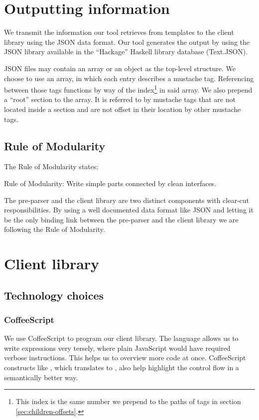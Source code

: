 \documentclass[thesis.tex]{subfiles}
\begin{document}
\section{Outputting information}
\label{sec:output}
We transmit the information our tool retrieves from templates to the client
library using the JSON data format. Our tool generates the output by using the
JSON library available in the ``Hackage'' Haskell library database (Text.JSON).

JSON files may contain an array or an object as the top-level structure.
We choose to use an array, in which each entry describes a mustache tag.
Referencing between those tags functions by way of the index\footnote{This index
	is the same number we prepend to the paths of tags in
	section \ref{sec:children-offsets}.} in said array.
We also prepend a ``root'' section to the array. It is referred to by mustache
tags that are not located inside a section and are not offset in their location
by other mustache tags.

\subsection{Rule of Modularity}
\label{sec:modularity}
The Rule of Modularity states:
\begin{citequote}{\cite[Chapter 1]{UXART}}
Rule of Modularity: Write simple parts connected by clean interfaces.
\end{citequote}
The pre-parser and the client library are two distinct components with clear-cut
responsibilities. By using a well documented data format like JSON and letting
it be the only binding link between the pre-parser and the client library we
are following the Rule of Modularity. 

\section{Client library}

\subsection{Technology choices}

\subsubsection{CoffeeScript}
\label{sec:coffeescript}
We use CoffeeScript to program our client library.
The language allows us to write expressions very tersely, where plain JavaScript
would have required verbose instructions. This helps us to overview more code at
once.
CoffeeScript constructs like , which translates to
, also help highlight the control flow in a semantically
better way.
\end{document}

